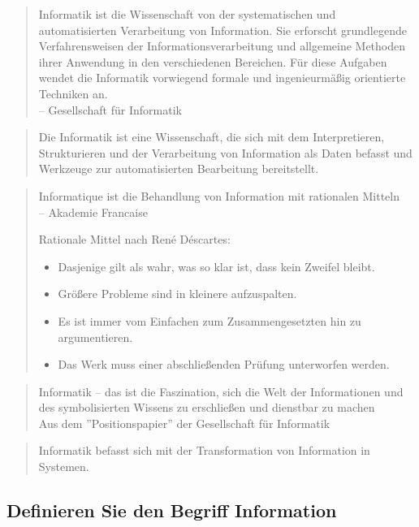 \begin{quote}
    Informatik ist die Wissenschaft von der systematischen und
    automatisierten Verarbeitung von Information. Sie erforscht
    grundlegende Verfahrensweisen der
    Informationsverarbeitung und allgemeine Methoden ihrer
    Anwendung in den verschiedenen Bereichen. Für diese
    Aufgaben wendet die Informatik vorwiegend formale und
    ingenieurmäßig orientierte Techniken an. \\
    -- Gesellschaft für Informatik
\end{quote}

\begin{quote}
    Die Informatik ist eine Wissenschaft, die sich mit dem
    Interpretieren, Strukturieren und der Verarbeitung von
    Information als Daten befasst und Werkzeuge zur automatisierten
    Bearbeitung bereitstellt.
\end{quote}

\begin{quote}
    Informatique ist die Behandlung von Information mit rationalen Mitteln \\
    -- Akademie Francaise

    Rationale Mittel nach René Déscartes:
    \begin{itemize}
      \item Dasjenige gilt als wahr, was so klar ist, dass kein Zweifel
        bleibt.
      \item Größere Probleme sind in kleinere aufzuspalten.
      \item Es ist immer vom Einfachen zum Zusammengesetzten hin zu
        argumentieren.
      \item Das Werk muss einer abschließenden Prüfung unterworfen
        werden.
    \end{itemize}
\end{quote}

\begin{quote}
    Informatik -- das ist die Faszination, sich die Welt der
    Informationen und des symbolisierten Wissens zu
    erschließen und dienstbar zu machen \\
    Aus dem ''Positionspapier'' der Gesellschaft für Informatik
\end{quote}

\begin{quote}
    Informatik befasst sich mit der Transformation von Information in
    Systemen.
\end{quote}

\subsection{Definieren Sie den Begriff Information}

